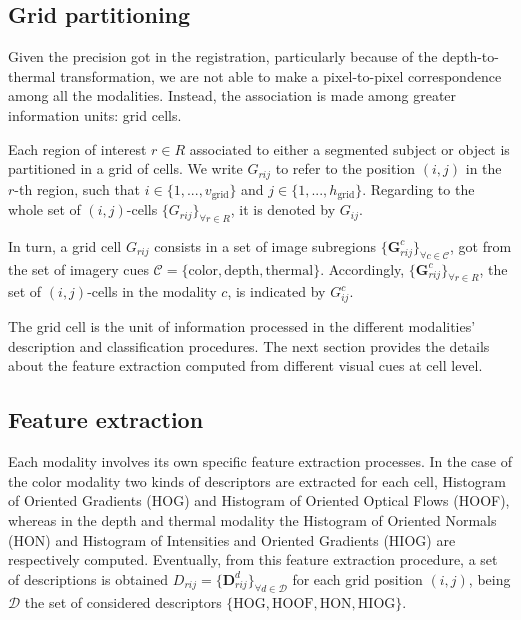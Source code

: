 \documentclass[10pt,twocolumn,letterpaper]{article}
\begin{document}
\subsection{Grid partitioning}
\label{ssec:gridpartitioning}

Given the precision got in the registration, particularly because of the depth-to-thermal transformation, we are not able to make a pixel-to-pixel correspondence among all the modalities. Instead, the association is made among greater information units: grid cells. 

Each region of interest $r \in R$ associated to either a segmented subject or object is partitioned in a grid of cells. We write $G_{rij}$ to refer to the position $(i,j)$ in the $r$-th region, such that $i \in \{ 1,...,v_\mathrm{grid} \}$ and $j \in \{ 1,...,h_\mathrm{grid} \}$. Regarding to the whole set of $(i,j)$-cells $\{G_{rij}\}_{\forall r \in R}$, it is denoted by $G_{ij}$.

In turn, a grid cell $G_{rij}$ consists in a set of image subregions $\{\mathbf{G}_{rij}^c\}_{\forall{c} \in \mathcal{C}}$, got from the set of imagery cues $\mathcal{C} = \{\mathrm{color}, \mathrm{depth}, \mathrm{thermal}\}$. Accordingly, $\{\mathbf{G}_{rij}^c\}_{\forall r \in R}$, the set of $(i,j)$-cells in the modality $c$, is indicated by $G_{ij}^c$.

The grid cell is the unit of information processed in the different modalities' description and classification procedures. The next section provides the details about the feature extraction computed from different visual cues at cell level.

\subsection{Feature extraction}
\label{ssec:feature extraction}

Each modality involves its own specific feature extraction processes. In the case of the color modality two kinds of descriptors are extracted for each cell, Histogram of Oriented Gradients (HOG) and Histogram of Oriented Optical Flows (HOOF), whereas in the depth and thermal modality the Histogram of Oriented Normals (HON) and Histogram of Intensities and Oriented Gradients (HIOG) are respectively computed. Eventually, from this feature extraction procedure, a set of descriptions is obtained $D_{rij} = \{\mathbf{D}_{rij}^d\}_{\forall d \in \mathcal{D}}$ for each grid position $(i,j)$, being $\mathcal{D}$ the set of considered descriptors $\{\mathrm{HOG}, \mathrm{HOOF}, \mathrm{HON}, \mathrm{HIOG}\}$.
\end{document}
